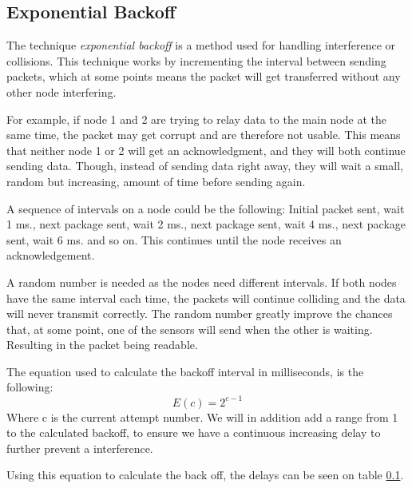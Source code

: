 \subsection{Exponential Backoff}\label{cha:expbackoff}
The technique \textit{exponential backoff} is a method used for handling interference or collisions. This technique works by incrementing the interval between sending packets, which at some points means the packet will get transferred without any other node interfering. 

For example, if node 1 and 2 are trying to relay data to the main node at the same time, the packet may get corrupt and are therefore not usable. This means that neither node 1 or 2 will get an acknowledgment, and they will both continue sending data. Though, instead of sending data right away, they will wait a small, random but increasing, amount of time before sending again.

A sequence of intervals on a node could be the following: Initial packet sent, wait 1 ms., next package sent, wait 2 ms.,  next package sent, wait 4 ms., next package sent, wait 6 ms. and so on. This continues until the node receives an acknowledgement.

A random number is needed as the nodes need different intervals. If both nodes have the same interval each time, the packets will continue colliding and the data will never transmit correctly. The random number greatly improve the chances that, at some point, one of the sensors will send when the other is waiting. Resulting in the packet being readable.

The equation used to calculate the backoff interval in milliseconds, is the following:
\begin{equation}
E(c)=2^{c-1}
\end{equation}
Where c is the current attempt number.
We will in addition add a range from 1 to the calculated backoff, to ensure we have a  continuous increasing delay to further prevent a interference.

Using this equation to calculate the back off, the delays can be seen on table \ref{cha:expbackoff}.

